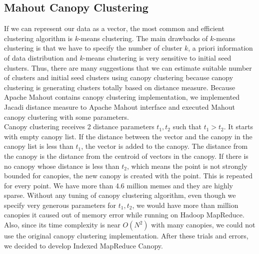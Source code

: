 \documentclass{sig-alternate}
\begin{document}
\subsection{Mahout Canopy Clustering}
If we can represent our data as a vector, the most common and efficient clustering algorithm is $k$-means clustering. The main drawbacks of $k$-means clustering is that we have to specify the number of cluster $k$, a priori information of data distribution and $k$-means clustering is very sensitive to initial seed clusters. Thus, there are many suggestions that we can estimate suitable number of clusters and initial seed clusters using canopy clustering \cite{McCallum2000} because canopy clustering is generating clusters totally based on distance measure. Because Apache Mahout contains canopy clustering implementation, we implemented Jacadi distance measure to Apache Mahout interface and executed Mahout canopy clustering with some parameters.
\\   Canopy clustering receives 2 distance parameters $t_1, t_2$ such that $t_1 > t_2$. It starts with empty canopy list. If the distance between the vector and the canopy in the canopy list is less than $t_1$, the vector is added to the canopy. The distance from the canopy is the distance from the centroid of vectors in the canopy. If there is no canopy whose distance is less than $t_2$, which means the point is not strongly bounded for canopies, the new canopy is created with the point. This is repeated for every point.
We have more than 4.6 million memes and they are highly sparse. Without any tuning of canopy clustering algorithm, even though we specify very generous parameters for $t_1,t_2$, we would have more than million canopies it caused out of memory error while running on Hadoop MapReduce. Also, since its time complexity is near $O(N^2)$ with many canopies, we could not use the original canopy clustering implementation. After these trials and errors, we decided to develop Indexed MapReduce Canopy.
\end{document}
